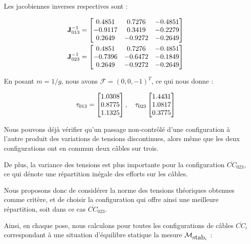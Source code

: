 Les jacobiennes inverses respectives sont :

\begin{equation}
\begin{split}
{\bf J}^{-1}_{013} = 
\begin{bmatrix}
0.4851 & 0.7276 & -0.4851 \\
-0.9117 & 0.3419 & -0.2279 \\
0.2649 & -0.9272 & -0.2649
\end{bmatrix}\\
{\bf J}^{-1}_{023} = 
\begin{bmatrix}
0.4851 & 0.7276 & -0.4851 \\
-0.7396 & -0.6472 & -0.1849 \\
0.2649 & -0.9272 & -0.2649
\end{bmatrix}
\end{split}
\label{chap01:eq05}
\end{equation}

En posant $m = 1/g$, nous avons \boldmath ${\mathcal F} = (0, 0, -1)^T$, ce 
qui 
nous donne :

\begin{equation}
{\bf \tau}_{013} = 
\begin{bmatrix}
1.0308 \\
0.8775 \\
1.1325
\end{bmatrix},
\quad
{\bf \tau}_{023}
\begin{bmatrix}
1.4431 \\
1.0817 \\
0.3775
\end{bmatrix}
\label{chap01:eq06}
\end{equation}

Nous pouvons d\'ej\`a v\'erifier qu'un passage non-contr\^ol\'e d'une 
configuration \`a l'autre produit des variations de tensions discontinues, 
alors m\^eme que les deux configurations ont en commun deux c\^ables sur trois.

De plus, la variance des tensions est plus importante pour la 
configuration $\overline{CC}_{023}$, ce qui dénote une répartition in\'egale 
des efforts sur les câbles.

Nous proposons donc de consid\'erer la norme des tensions th\'eoriques 
obtenues comme critère, et de choisir la configuration qui offre ainsi une meilleure 
r\'epartition, soit dans ce cas $\overline{CC}_{023}$.

Ainsi, en chaque pose, nous calculons pour toutes les configurations de câbles 
$\overline{CC}_i$ correspondant à une situation d'équilibre statique la mesure 
$\mathcal M_{\hbox{stab}_i}$ :

